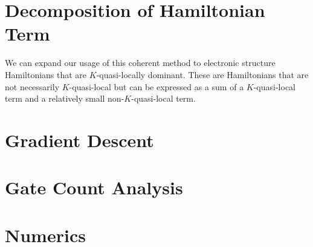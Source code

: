 \section{Decomposition of Hamiltonian Term}

We can expand our usage of this coherent method to electronic structure Hamiltonians that are $K$-quasi-locally dominant. These are Hamiltonians that are not necessarily $K$-quasi-local but can be expressed as a sum of a $K$-quasi-local term and a relatively small non-$K$-quasi-local term.




\section{Gradient Descent}
\section{Gate Count Analysis}
\section{Numerics}



